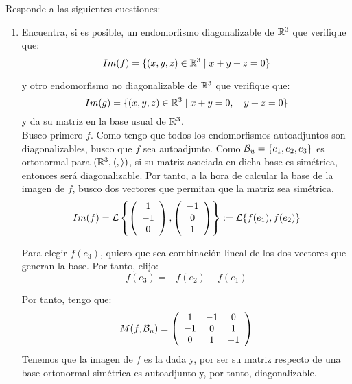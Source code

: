 \documentclass[12pt]{article}
\begin{document}
\begin{ejercicio} Responde a las siguientes cuestiones:

\begin{enumerate}
    \item Encuentra, si es posible, un endomorfismo diagonalizable de $\mathbb{R}^3$ que verifique que:
    \begin{equation*}
        Im(f)=\{(x,y,z)\in \mathbb{R}^3\mid x+y+z=0\}
    \end{equation*}
    
    y otro endomorfismo no diagonalizable de $\mathbb{R}^3$ que verifique que:
    \begin{equation*}
        Im(g)=\{(x,y,z)\in \mathbb{R}^3\mid x+y=0,\quad y+z=0\}
    \end{equation*}
    y da su matriz en la base usual de $\mathbb{R}^3$.\\


    Busco primero $f$. Como tengo que todos los endomorfismos autoadjuntos son diagonalizables, busco que $f$ sea autoadjunto. Como $\mathcal{B}_u=\{e_1,e_2,e_3\}$ es ortonormal para $(\mathbb{R}^3, \langle, \rangle)$, si su matriz asociada en dicha base es simétrica, entonces será diagonalizable. Por tanto, a la hora de calcular la base de la imagen de $f$, busco dos vectores que permitan que la matriz sea simétrica.
    \begin{equation*}
        Im(f)=\mathcal{L}\left\{
        \left(\begin{array}{c}
            1 \\ -1 \\ 0
        \end{array}\right),
        \left(\begin{array}{c}
            -1 \\ 0 \\ 1
        \end{array}\right)
        \right\} :=\mathcal{L}\{f(e_1), f(e_2)\}
    \end{equation*}

    Para elegir $f(e_3)$, quiero que sea combinación lineal de los dos vectores que generan la base. Por tanto, elijo:
    \begin{equation*}
        f(e_3)=-f(e_2)-f(e_1)
    \end{equation*}

    Por tanto, tengo que:
    \begin{equation*}
        M(f,\mathcal{B}_u)=
        \left(\begin{array}{ccc}
            1 & -1 & 0 \\
            -1 & 0 & 1 \\
            0 & 1 & -1
        \end{array}\right)
    \end{equation*}
    Tenemos que la imagen de $f$ es la dada y, por ser su matriz respecto de una base ortonormal simétrica es autoadjunto y, por tanto, diagonalizable.


\end{enumerate}
\end{ejercicio}
\end{document}
